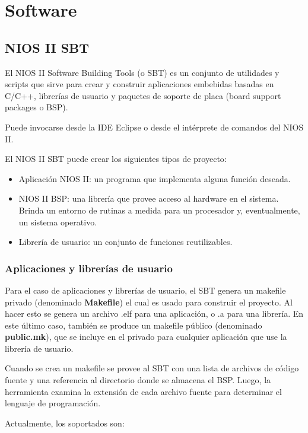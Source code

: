 \section{Software}

\subsection{NIOS II SBT}

El NIOS II Software Building Tools (o SBT) es un conjunto de utilidades y scripts que sirve para crear y construir aplicaciones embebidas basadas en C/C++, librerías de usuario y paquetes de soporte de placa (board support packages o BSP). 

Puede invocarse desde la IDE Eclipse o desde el intérprete de comandos del NIOS II.

El NIOS II SBT puede crear los siguientes tipos de proyecto:
\begin{itemize}
	\item Aplicación NIOS II: un programa que implementa alguna función deseada.
	\item NIOS II BSP: una librería que provee acceso al hardware en el sistema. Brinda un entorno de rutinas a medida para un procesador y, eventualmente, un sistema operativo. 
	\item Librería de usuario: un conjunto de funciones reutilizables. 
\end{itemize}

\subsubsection{Aplicaciones y librerías de usuario}

Para el caso de aplicaciones y librerías de usuario, el SBT genera un makefile privado (denominado \textbf{Makefile}) el cual es usado para construir el proyecto. Al hacer esto se genera un archivo .elf para una aplicación, o .a para una librería. En este último caso, también se produce un makefile público (denominado \textbf{public.mk}), que se incluye en el privado para cualquier aplicación que use la librería de usuario.

Cuando se crea un makefile se provee al SBT con una lista de archivos de código fuente y una referencia al directorio donde se almacena el BSP. Luego, la herramienta examina la extensión de cada archivo fuente para determinar el lenguaje de programación. 

Actualmente, los soportados son:

